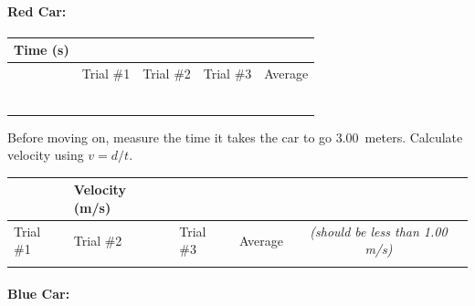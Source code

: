 \documentclass[10pt]{exam}
\begin{document}
  \def\cw{7em}
  \newcommand{\datatable}{
    \renewcommand{\arraystretch}{1.65}
      \begin{tabular}
        {
          |*{4}{>{\centering\arraybackslash}m{\cw}|}
          |>{\centering\arraybackslash}m{\cw}|
        }
        \hline
        \multirow{2}{\cw}
          {\centering Time (s)} & 
        \multicolumn{4}{c|}{Displacement (m)} \\
        \cline{2-5}
        & Trial \#1 & Trial \#2 & Trial \#3 & Average \\
        \hline
        2 &&&&\\
        \hline
        4 &&&&\\
        \hline
        6 &&&&\\
        \hline
        8 &&&&\\
        \hline
        10 &&&&\\
        \hline
        12 &&&&\\
        \hline
      \end{tabular}

      \vspace{1em}

      Before moving on, measure the time it takes the car to go 3.00~meters.  Calculate velocity using $v=d/t$.

      \begin{tabular}{|*{3}{>{\centering\arraybackslash}m{5.5em}|}|
        >{\centering\arraybackslash}m{5.7em}|||c|}
        \hline
        \multicolumn{4}{|c|||}{Time to travel 3.00 m (s) } & Velocity (m/s) \\\cline{1-4}
         Trial \#1 & Trial \#2 & Trial \#3 & Average & \emph{\small (should be less than 1.00 m/s)}\\\hline
         & & & & \\[0.5em] \hline
      \end{tabular}

  }

  \paragraph{Red Car:} \hfill

  \hfill

  \datatable

  \pagebreak

  \paragraph{Blue Car:} \hfill
\end{document}
